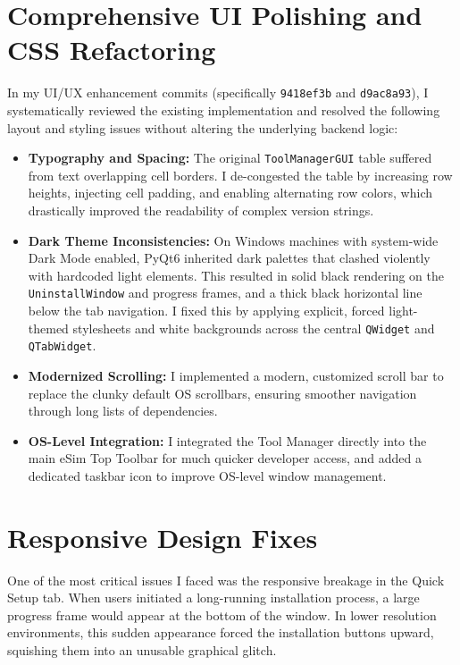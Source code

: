 \documentclass[12pt,a4paper]{report}
\begin{document}
\section{Comprehensive UI Polishing and CSS Refactoring}
In my UI/UX enhancement commits (specifically \texttt{9418ef3b} and \texttt{d9ac8a93}), I systematically reviewed the existing implementation and resolved the following layout and styling issues without altering the underlying backend logic:

\begin{itemize}
    \item \textbf{Typography and Spacing:} The original \texttt{ToolManagerGUI} table suffered from text overlapping cell borders. I de-congested the table by increasing row heights, injecting cell padding, and enabling alternating row colors, which drastically improved the readability of complex version strings.
    \item \textbf{Dark Theme Inconsistencies:} On Windows machines with system-wide Dark Mode enabled, PyQt6 inherited dark palettes that clashed violently with hardcoded light elements. This resulted in solid black rendering on the \texttt{UninstallWindow} and progress frames, and a thick black horizontal line below the tab navigation. I fixed this by applying explicit, forced light-themed stylesheets and white backgrounds across the central \texttt{QWidget} and \texttt{QTabWidget}.
    \item \textbf{Modernized Scrolling:} I implemented a modern, customized scroll bar to replace the clunky default OS scrollbars, ensuring smoother navigation through long lists of dependencies.
    \item \textbf{OS-Level Integration:} I integrated the Tool Manager directly into the main eSim Top Toolbar for much quicker developer access, and added a dedicated taskbar icon to improve OS-level window management.
\end{itemize}

\section{Responsive Design Fixes}
One of the most critical issues I faced was the responsive breakage in the Quick Setup tab. When users initiated a long-running installation process, a large progress frame would appear at the bottom of the window. In lower resolution environments, this sudden appearance forced the installation buttons upward, squishing them into an unusable graphical glitch.
\end{document}
